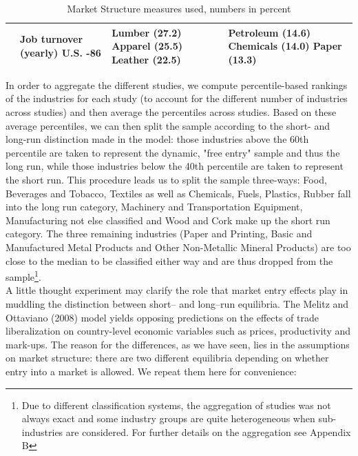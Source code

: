 \begin{center}
\begin{table}
\begin{tabular}{|p{2.8cm}|p{4cm}|p{4cm}|p{4cm}|}
\hline
\citet{Baldwin1994} & Job turnover (yearly) \newline U.S. \newline 73-86 & Lumber (27.2) \newline Apparel (25.5) \newline Leather (22.5) & Petroleum (14.6) \newline Chemicals (14.0) \newline Paper (13.3) \\
\hline   
\end{tabular}\caption{Market Structure measures used, numbers in percent}\label{tb:market_lit}
\end{table} 
\end{center}

In order to aggregate the different studies, we compute percentile-based rankings of the industries for each study (to account for the different number of industries across studies) and then average the percentiles across studies. Based on these average percentiles, we can then split the sample according to the short- and long-run distinction made in the model: those industries above the 60th percentile are taken to represent the dynamic, "free entry" sample and thus the long run, while those industries below the 40th percentile are taken to represent the short run. This procedure leads us to split the sample three-ways: Food, Beverages and Tobacco, Textiles as well as Chemicals, Fuels, Plastics, Rubber fall into the long run category, Machinery and Transportation Equipment, Manufacturing not else classified and Wood and Cork make up the short run category. The three remaining industries (Paper and Printing, Basic and Manufactured Metal Products and Other Non-Metallic Mineral Products) are too close to the median to be classified either way and are thus dropped from the sample\footnote{Due to different classification systems, the aggregation of studies was not always exact and some industry groups are quite heterogeneous when sub-industries are considered. For further details on the aggregation see Appendix B}. \\
A little thought experiment may clarify the role that market entry effects play in muddling the distinction between short-- and long--run equilibria. The Melitz and Ottaviano (2008) model yields opposing predictions on the effects of trade liberalization on country-level economic variables such as prices, productivity and mark-ups. The reason for the differences, as we have seen, lies in the assumptions on market structure: there are two different equilibria depending on whether entry into a market is allowed. We repeat them here for convenience:

